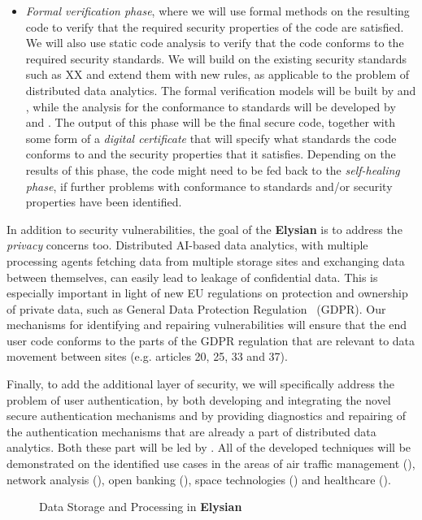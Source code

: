 \documentclass[a4paper,11pt]{article}
\newcommand{\project}[1]{\textbf{#1}\xspace}
\newcommand{\SECURITY}{\project{Elysian}}
\newcommand{\TheProject}{\SECURITY}
\begin{document}
\begin{itemize}
\item \emph{Formal verification phase}, where we will use formal methods on the resulting code to verify that the required security properties of the code are satisfied. We will also use static code analysis to verify that the code conforms to the required security standards. We will build on the existing security standards such as XX and extend them with new rules, as applicable to the problem of distributed data analytics. The formal verification models will be built by \SCCHshort{} and \SAshort{}, while the analysis for the conformance to standards will be developed by \UCMshort{} and \YAGshort{}. The output of this phase will be the final secure code, together with some form of a \emph{digital certificate} that will specify what standards the code conforms to and the security properties that it satisfies. Depending on the results of this phase, the code might need to be fed back to the \emph{self-healing phase}, if further problems with conformance to standards and/or security properties have been identified.
\end{itemize}

In addition to security vulnerabilities, the goal of the \TheProject{} is to address the \emph{privacy} concerns too. Distributed AI-based data analytics, with multiple processing agents fetching data from multiple storage sites and exchanging data between themselves, can easily lead to leakage of confidential data. This is especially important in light of new EU regulations on protection and ownership of private data, such as General Data Protection Regulation~\cite{gdpr} (GDPR). Our mechanisms for identifying and repairing vulnerabilities will ensure that the end user code conforms to the parts of the GDPR regulation that are relevant to data movement between sites (e.g. articles 20, 25, 33 and 37). 

Finally, to add the additional layer of security, we will specifically address the problem of user authentication, by both developing and integrating the novel secure authentication mechanisms and by providing diagnostics and repairing of the authentication mechanisms that are already a part of distributed data analytics. Both these part will be led by \COGNIshort{}. All of the developed techniques will be demonstrated on the identified use cases in the areas of air traffic management (\FRQshort{}), network analysis (\DEMshort{}), open banking (\SOPRAshort{}), space technologies (\SOPRAshort{}) and healthcare (\SOPRAshort{}). 


\begin{figure}[tp]
  \begin{center}
  \vspace{-5mm}
  \vspace{-1.5cm}
  \caption{Data Storage and Processing in \TheProject{}}
  \label{fig:storageprocessing}
  \end{center}
  \end{figure}
\end{document}
